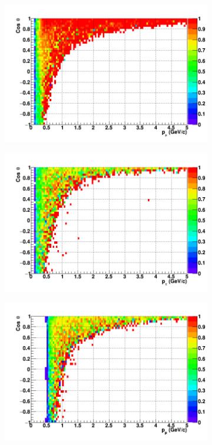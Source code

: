 \begin{figure}
  \centering
    \begin{subfigure}{.49\textwidth}
    \includegraphics[width=\linewidth]{fig/Efficiency_Muon.png}
  \end{subfigure}
    \begin{subfigure}{.49\textwidth}
    \includegraphics[width=\linewidth]{fig/Efficiency_Pion.png}
  \end{subfigure}
    \begin{subfigure}{.49\textwidth}
    \includegraphics[width=\linewidth]{fig/Efficiency_Proton.png}

\end{subfigure}
\end{figure}
